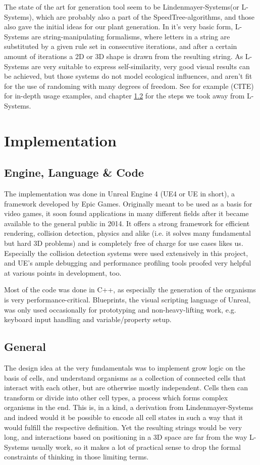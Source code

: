\documentclass[11pt]{scrartcl}
\begin{document}
The state of the art for generation tool seem to be Lindenmayer-Systems(or L-Systems), which are probably also a part of the SpeedTree-algorithms, and those also gave the initial ideas for our plant generation. In it's very basic form, L-Systems are string-manipulating formalisms, where letters in a string are substituted by a given rule set in consecutive iterations, and after a certain amount of iterations a 2D or 3D shape is drawn from the resulting string. As L-Systems are very suitable to express self-similarity, very good visual results can be achieved, but those systems do not model ecological influences, and aren't fit for the use of randoming with many degrees of freedom. See for example (CITE) for in-depth usage examples, and chapter \ref{cpt:ImplGeneral} for the steps we took away from L-Systems.

\section{Implementation}
\subsection{Engine, Language \& Code}
The implementation was done in Unreal Engine 4 (UE4 or UE in short), a framework developed by Epic Games. Originally meant to be used as a basis for video games, it soon found applications in many different fields after it became available to the general public in 2014. It offers a strong framework for efficient rendering, collision detection, physics and alike (i.e. it solves many fundamental but hard 3D problems) and is completely free of charge for use cases likes us. Especially the collision detection systems were used extensively in this project, and UE's ample debugging and performance profiling tools proofed very helpful at various points in development, too. 

Most of the code was done in C++, as especially the generation of the organisms is very performance-critical. Blueprints, the visual scripting language of Unreal, was only used occasionally for prototyping and non-heavy-lifting work, e.g. keyboard input handling and variable/property setup.

\subsection{General} \label{cpt:ImplGeneral}
The design idea at the very fundamentals was to implement grow logic on the basis of cells, and understand organisms as a collection of connected cells that interact with each other, but are otherwise mostly independent. Cells then can transform or divide into other cell types, a process which forms complex organisms in the end. This is, in a kind, a derivation from Lindenmayer-Systems and indeed would it be possible to encode all cell states in such a way that it would fulfill the respective definition. Yet the resulting strings would be very long, and interactions based on positioning in a 3D space are far from the way L-Systems usually work, so it makes a lot of practical sense to drop the formal constraints of thinking in those limiting terms. 
\end{document}
